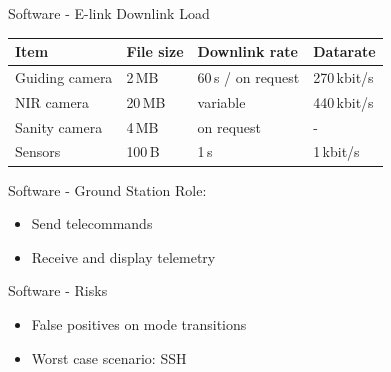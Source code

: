 \documentclass[11pt, aspectratio=169]{beamer}
\begin{document}
    \begin{frame}[t]{Software - E-link Downlink Load}
        \centering
        \vspace{1cm}
        \begin{center}
            \begin{tabular}{| l | l | l | l |}
                \hline
                \textbf{Item} & \textbf{File size} & \textbf{Downlink rate} & \textbf{Datarate} \\\hline\hline

                Guiding camera    & 2\,MB     & 60\,s / on request    & 270\,kbit/s  \\\hline
                NIR camera        & 20\,MB    & variable              & 440\,kbit/s  \\\hline
                Sanity camera     & 4\,MB     & on request            & -            \\\hline
                Sensors           & 100\,B    & 1\,s                  & 1\,kbit/s    \\\hline
            \end{tabular}
        \end{center}

    \end{frame}


    \begin{frame}[c]{Software - Ground Station}
        Role:
        \begin{itemize}
            \item Send telecommands
            \item Receive and display telemetry
        \end{itemize}
    \end{frame}

    \begin{frame}[c]{Software - Risks}
        \begin{itemize}
            \item False positives on mode transitions
            \item Worst case scenario: SSH
        \end{itemize}
    \end{frame}
\end{document}
